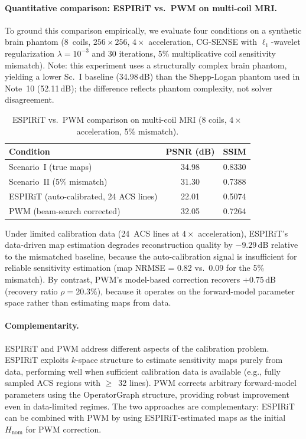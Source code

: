 \documentclass[11pt]{article}
\begin{document}
\paragraph{Quantitative comparison: ESPIRiT vs.\ PWM on multi-coil MRI.}
To ground this comparison empirically, we evaluate four conditions on a synthetic brain phantom (8~coils, $256 \times 256$, $4\times$ acceleration, CG-SENSE with $\ell_1$-wavelet regularization $\lambda = 10^{-3}$ and 30 iterations, 5\% multiplicative coil sensitivity mismatch).  Note: this experiment uses a structurally complex brain phantom, yielding a lower Sc.~I baseline (34.98\,dB) than the Shepp-Logan phantom used in Note~10 (52.11\,dB); the difference reflects phantom complexity, not solver disagreement.

\begin{table}[ht]
\centering\small
\caption{ESPIRiT vs.\ PWM comparison on multi-coil MRI (8 coils, $4\times$ acceleration, 5\% mismatch).}
\label{tab:espirit_comparison}
\begin{tabular}{@{}lcc@{}}
\toprule
Condition & PSNR (dB) & SSIM \\
\midrule
Scenario~I (true maps) & 34.98 & 0.8330 \\
Scenario~II (5\% mismatch) & 31.30 & 0.7388 \\
ESPIRiT (auto-calibrated, 24 ACS lines) & 22.01 & 0.5074 \\
PWM (beam-search corrected) & 32.05 & 0.7264 \\
\bottomrule
\end{tabular}
\end{table}

\noindent Under limited calibration data (24~ACS lines at $4\times$ acceleration), ESPIRiT's data-driven map estimation degrades reconstruction quality by $-9.29$\,dB relative to the mismatched baseline, because the auto-calibration signal is insufficient for reliable sensitivity estimation (map NRMSE = 0.82 vs.\ 0.09 for the 5\% mismatch). By contrast, PWM's model-based correction recovers $+0.75$\,dB (recovery ratio $\rho = 20.3\%$), because it operates on the forward-model parameter space rather than estimating maps from data.

\paragraph{Complementarity.} ESPIRiT and PWM address different aspects of the calibration problem. ESPIRiT exploits $k$-space structure to estimate sensitivity maps purely from data, performing well when sufficient calibration data is available (e.g., fully sampled ACS regions with $\geq$~32 lines). PWM corrects arbitrary forward-model parameters using the OperatorGraph structure, providing robust improvement even in data-limited regimes. The two approaches are complementary: ESPIRiT can be combined with PWM by using ESPIRiT-estimated maps as the initial $H_{\mathrm{nom}}$ for PWM correction.
\end{document}
